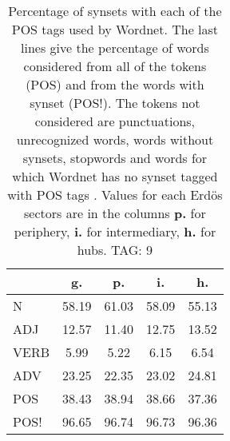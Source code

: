 \begin{table}[h!]
\begin{center}
\begin{tabular}{| l || c | c | c | c |}\hline
 & {\bf g.} & {\bf p.} & {\bf i.} & {\bf h.} \\\hline\hline
N & 58.19  & 61.03  & 58.09  & 55.13 \\\hline
ADJ & 12.57  & 11.40  & 12.75  & 13.52 \\\hline
VERB & 5.99  & 5.22  & 6.15  & 6.54 \\\hline
ADV & 23.25  & 22.35  & 23.02  & 24.81 \\\hline\hline
POS & 38.43  & 38.94  & 38.66  & 37.36 \\\hline
POS! & 96.65  & 96.74  & 96.73  & 96.36 \\\hline
\end{tabular}
\caption{Percentage of synsets with each of the POS tags used by Wordnet. The last lines give the percentage of words considered from all of the tokens (POS) and from the words with synset (POS!). The tokens not considered are punctuations, unrecognized words, words without synsets, stopwords and words for which Wordnet has no synset  tagged with POS tags . Values for each Erd\"os sectors are in the columns {{\bf p.}} for periphery, {{\bf i.}} for intermediary, {{\bf h.}} for hubs. TAG: 9}
\end{center}
\end{table}
